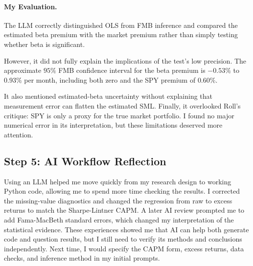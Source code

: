 \paragraph{My Evaluation.} The LLM correctly distinguished OLS from FMB
inference and compared the estimated beta premium with the market premium
rather than simply testing whether beta is significant.

However, it did not fully explain the implications of the test's low precision.
The approximate $95\%$ FMB confidence interval for the beta premium is
$-0.53\%$ to $0.93\%$ per month, including both zero and the SPY premium of
$0.60\%$.

It also mentioned estimated-beta uncertainty without explaining that
measurement error can flatten the estimated SML. Finally, it overlooked Roll's
critique: SPY is only a proxy for the true market portfolio. I found no major
numerical error in its interpretation, but these limitations deserved more
attention.

\subsection{Step 5: AI Workflow Reflection}

Using an LLM helped me move quickly from my research design to working Python
code, allowing me to spend more time checking the results. I corrected the
missing-value diagnostics and changed the regression from raw to excess returns
to match the Sharpe-Lintner CAPM. A later AI review prompted me to add
Fama-MacBeth standard errors, which changed my interpretation of the
statistical evidence. These experiences showed me that AI can help both
generate code and question results, but I still need to verify its methods and
conclusions independently. Next time, I would specify the CAPM form, excess
returns, data checks, and inference method in my initial prompts.
